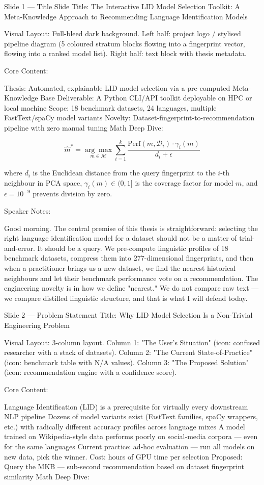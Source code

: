 Slide 1 — Title Slide
Title: The Interactive LID Model Selection Toolkit: A Meta-Knowledge Approach to Recommending Language Identification Models

Visual Layout: Full-bleed dark background. Left half: project logo / stylised pipeline diagram (5 coloured stratum blocks flowing into a fingerprint vector, flowing into a ranked model list). Right half: text block with thesis metadata.

Core Content:

Thesis: Automated, explainable LID model selection via a pre-computed Meta-Knowledge Base
Deliverable: A Python CLI/API toolkit deployable on HPC or local machine
Scope: 18 benchmark datasets, 24 languages, multiple FastText/spaCy model variants
Novelty: Dataset-fingerprint-to-recommendation pipeline with zero manual tuning
Math Deep Dive:

$$\hat{m}^* = \underset{m \in \mathcal{M}}{\arg\max} \sum_{i=1}^{k} \frac{\text{Perf}(m, \mathcal{D}_i) \cdot \gamma_i(m)}{d_i + \epsilon}$$

where $d_i$ is the Euclidean distance from the query fingerprint to the $i$-th neighbour in PCA space, $\gamma_i(m) \in (0,1]$ is the coverage factor for model $m$, and $\epsilon = 10^{-9}$ prevents division by zero.

Speaker Notes:

Good morning. The central premise of this thesis is straightforward: selecting the right language identification model for a dataset should not be a matter of trial-and-error. It should be a query. We pre-compute linguistic profiles of 18 benchmark datasets, compress them into 277-dimensional fingerprints, and then when a practitioner brings us a new dataset, we find the nearest historical neighbours and let their benchmark performance vote on a recommendation. The engineering novelty is in how we define "nearest." We do not compare raw text — we compare distilled linguistic structure, and that is what I will defend today.

Slide 2 — Problem Statement
Title: Why LID Model Selection Is a Non-Trivial Engineering Problem

Visual Layout: 3-column layout. Column 1: "The User's Situation" (icon: confused researcher with a stack of datasets). Column 2: "The Current State-of-Practice" (icon: benchmark table with N/A values). Column 3: "The Proposed Solution" (icon: recommendation engine with a confidence score).

Core Content:

Language Identification (LID) is a prerequisite for virtually every downstream NLP pipeline
Dozens of model variants exist (FastText families, spaCy wrappers, etc.) with radically different accuracy profiles across language mixes
A model trained on Wikipedia-style data performs poorly on social-media corpora — even for the same languages
Current practice: ad-hoc evaluation — run all models on new data, pick the winner. Cost: hours of GPU time per selection
Proposed: Query the MKB — sub-second recommendation based on dataset fingerprint similarity
Math Deep Dive:

